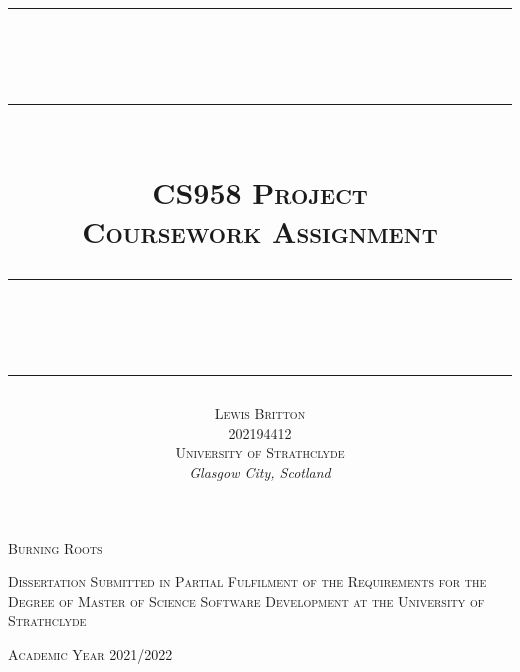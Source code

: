 \documentclass[11pt, english]{article}
\newcommand{\HRule}[1]{\rule{\linewidth}{#1}}
\begin{document}


	\title{
		\HRule{0.5pt}\\ [-0.9cm]
                \HRule{0.5pt}\\ [0.4cm]
                \huge\textsc{CS958 Project}\\
                \Large\textsc{Coursework Assignment}\\ [0.25cm]
		\HRule{0.5pt}\\ [-0.725cm]
                \HRule{0.5pt}
                }
	\author{
		\textsc{Lewis Britton}\\
                \textsc{202194412}\\
                \textsc{University of Strathclyde}\\
		\textit{Glasgow City, Scotland}
                }
	\date{}
	\maketitle

        \begin{center}
		\huge{\textsc{Burning Roots}}
        \end{center}

        \vspace{\fill}

	\begin{center}
	\end{center}

	\begin{center}
        	\textsc{Dissertation Submitted in Partial Fulfilment of the Requirements for the Degree of Master of Science Software Development at the University of Strathclyde}
	\end{center}

	\begin{center}
		\textsc{Academic Year 2021/2022}
	\end{center}

\newpage

\end{document}
